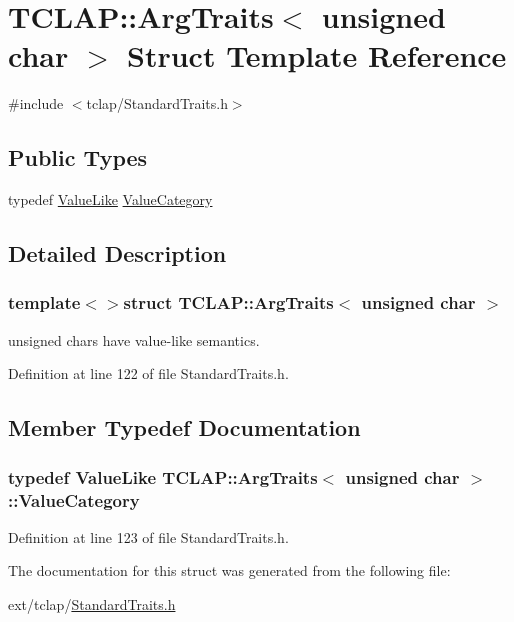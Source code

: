 \hypertarget{struct_t_c_l_a_p_1_1_arg_traits_3_01unsigned_01char_01_4}{}\section{T\+C\+L\+A\+P\+:\+:Arg\+Traits$<$ unsigned char $>$ Struct Template Reference}
\label{struct_t_c_l_a_p_1_1_arg_traits_3_01unsigned_01char_01_4}


{\ttfamily \#include $<$tclap/\+Standard\+Traits.\+h$>$}

\subsection*{Public Types}
\begin{DoxyCompactItemize}
\item 
typedef \hyperlink{struct_t_c_l_a_p_1_1_value_like}{Value\+Like} \hyperlink{struct_t_c_l_a_p_1_1_arg_traits_3_01unsigned_01char_01_4_a3cba1e41ab04d31c7b68b1c5e6e227aa}{Value\+Category}
\end{DoxyCompactItemize}


\subsection{Detailed Description}
\subsubsection*{template$<$$>$struct T\+C\+L\+A\+P\+::\+Arg\+Traits$<$ unsigned char $>$}

unsigned chars have value-\/like semantics. 

Definition at line 122 of file Standard\+Traits.\+h.



\subsection{Member Typedef Documentation}
\hypertarget{struct_t_c_l_a_p_1_1_arg_traits_3_01unsigned_01char_01_4_a3cba1e41ab04d31c7b68b1c5e6e227aa}{}
\subsubsection[{Value\+Category}]{\setlength{\rightskip}{0pt plus 5cm}typedef {\bf Value\+Like} {\bf T\+C\+L\+A\+P\+::\+Arg\+Traits}$<$ unsigned char $>$\+::{\bf Value\+Category}}\label{struct_t_c_l_a_p_1_1_arg_traits_3_01unsigned_01char_01_4_a3cba1e41ab04d31c7b68b1c5e6e227aa}


Definition at line 123 of file Standard\+Traits.\+h.



The documentation for this struct was generated from the following file\+:\begin{DoxyCompactItemize}
\item 
ext/tclap/\hyperlink{_standard_traits_8h}{Standard\+Traits.\+h}\end{DoxyCompactItemize}
